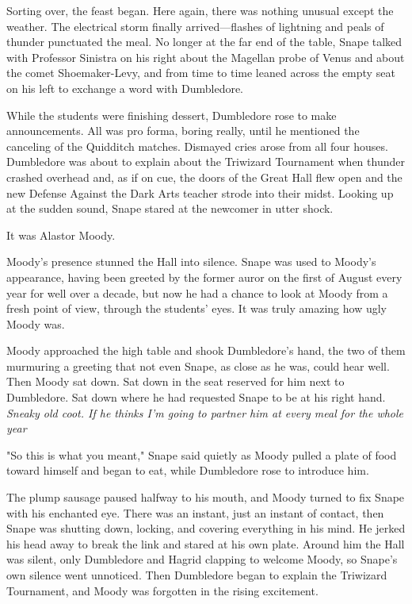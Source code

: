 Sorting over, the feast began. Here again, there was nothing unusual except the weather. The electrical storm finally arrived—flashes of lightning and peals of thunder punctuated the meal. No longer at the far end of the table, Snape talked with Professor Sinistra on his right about the Magellan probe of Venus and about the comet Shoemaker-Levy, and from time to time leaned across the empty seat on his left to exchange a word with Dumbledore.

While the students were finishing dessert, Dumbledore rose to make announcements. All was pro forma, boring really, until he mentioned the canceling of the Quidditch matches. Dismayed cries arose from all four houses. Dumbledore was about to explain about the Triwizard Tournament when thunder crashed overhead and, as if on cue, the doors of the Great Hall flew open and the new Defense Against the Dark Arts teacher strode into their midst. Looking up at the sudden sound, Snape stared at the newcomer in utter shock.

It was Alastor Moody.

Moody's presence stunned the Hall into silence. Snape was used to Moody's appearance, having been greeted by the former auror on the first of August every year for well over a decade, but now he had a chance to look at Moody from a fresh point of view, through the students' eyes. It was truly amazing how ugly Moody was.

Moody approached the high table and shook Dumbledore's hand, the two of them murmuring a greeting that not even Snape, as close as he was, could hear well. Then Moody sat down. Sat down in the seat reserved for him next to Dumbledore. Sat down where he had requested Snape to be at his right hand. \emph{Sneaky old coot. If he thinks I'm going to partner him at every meal for the whole year{\el}}

"So this is what you meant," Snape said quietly as Moody pulled a plate of food toward himself and began to eat, while Dumbledore rose to introduce him.

The plump sausage paused halfway to his mouth, and Moody turned to fix Snape with his enchanted eye. There was an instant, just an instant of contact, then Snape was shutting down, locking, and covering everything in his mind. He jerked his head away to break the link and stared at his own plate. Around him the Hall was silent, only Dumbledore and Hagrid clapping to welcome Moody, so Snape's own silence went unnoticed. Then Dumbledore began to explain the Triwizard Tournament, and Moody was forgotten in the rising excitement.

